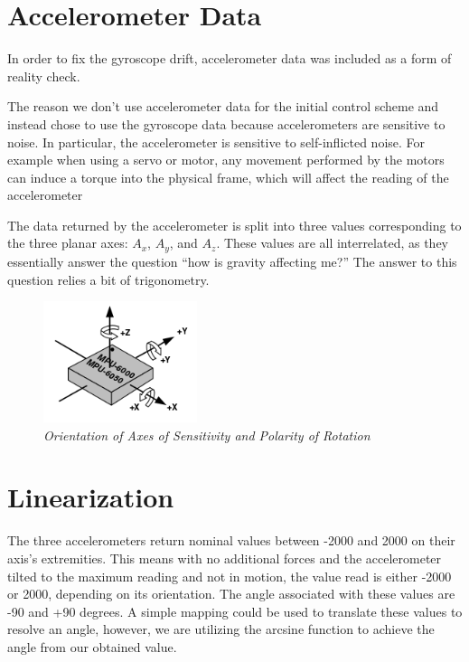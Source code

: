 \documentclass{IEEEtran}
\begin{document}
\section{Accelerometer Data}
In order to fix the gyroscope drift, accelerometer data was included as a form of reality check.

The reason we don't use accelerometer data for the initial control scheme and instead chose to use the gyroscope data because accelerometers are sensitive to noise. In particular, the accelerometer is sensitive to self-inflicted noise. For example when using a servo or motor, any movement performed by the motors can induce a torque into the physical frame, which will affect the reading of the accelerometer

The data returned by the accelerometer is split into three values corresponding to the three planar axes: $A_x$, $A_y$, and $A_z$. These values are all interrelated, as they essentially answer the question ``how is gravity affecting me?'' The answer to this question relies a bit of trigonometry.


\begin{figure}[ht!]
  \centering
      \includegraphics[width=0.4\textwidth]{orientation}
  \caption{\emph{Orientation of Axes of Sensitivity and Polarity of Rotation \cite{mpuPSmanual}}}

\end{figure}


\section{Linearization}
The three accelerometers return nominal values between -2000 and 2000 on their axis's extremities. This means with no additional forces and the accelerometer tilted to the maximum reading and not in motion, the value read is either -2000 or 2000, depending on its orientation. The angle associated with these values are -90 and +90 degrees. A simple mapping could be used to translate these values to resolve an angle, however, we are utilizing the arcsine function to achieve the angle from our obtained value. 
\end{document}
